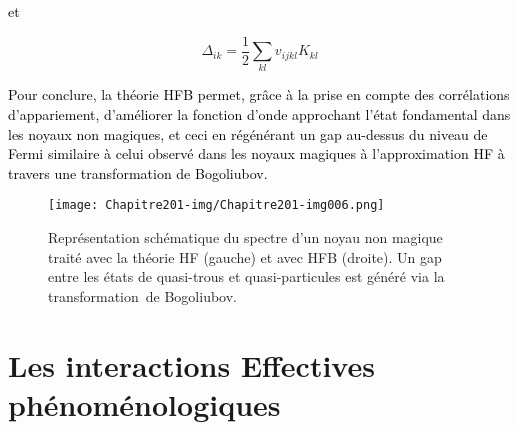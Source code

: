 \textcolor{black}{et}\textcolor{black}{
\ }

 \begin{equation}
 {\Delta}_{\mathit{ik}}=\frac 1 2\sum
_{\mathit{kl}}v_{\mathit{ijkl}}K_{\mathit{kl}}
\end{equation}

\textcolor{black}{ Pour conclure, la théorie HFB permet, grâce à la prise en compte des corrélations d'appariement,
d'améliorer la fonction d'onde approchant l'état fondamental dans les noyaux non magiques, et ceci en régénérant un gap
au-dessus du niveau de Fermi similaire à celui observé dans les noyaux magiques à l'approximation HF à travers une
transformation de Bogoliubov.}


 \begin{figure}[htb]
 	\texttt{[image: Chapitre201-img/Chapitre201-img006.png]}
 	\caption{Représentation schématique du spectre d'un noyau non magique traité avec la théorie HF (gauche) et avec HFB
(droite). Un gap entre les états de quasi-trous et quasi-particules est généré via la transformation~de Bogoliubov.
}
 \end{figure}

\section{Les interactions Effectives phénoménologiques}

